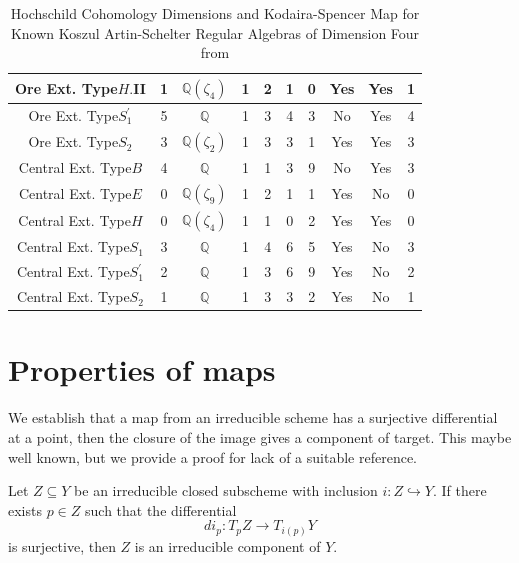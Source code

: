\documentclass{amsart}
\begin{document}
\begin{table}[H]
\begin{tabular}{|c|c|c|c|c|c|c|c|c|c|}
        Ore Ext. Type$H.$II  & 1 & $\mathbb{Q} (\zeta_4)$ & 1 & 2 & 1 & 0 & Yes & Yes & 1 \\ \hline
        Ore Ext. Type$S_1^{'}$  & 5 & $\mathbb{Q}$ & 1 & 3 & 4 & 3 & No & Yes & 4 \\ \hline
        Ore Ext. Type$S_2$& 3 & $\mathbb{Q} (\zeta_2)$ & 1 & 3 & 3 & 1 & Yes & Yes & 3\\ \hline
        Central Ext. Type$B$  & 4 & $\mathbb{Q}$ & 1 & 1 & 3 & 9 & No & Yes & 3\\ \hline
        Central Ext. Type$E$ & 0 & $\mathbb{Q}(\zeta_9)$ & 1 & 2 & 1 & 1 & Yes & No & 0\\ \hline
        Central Ext. Type$H$  &  0 & $\mathbb{Q}(\zeta_4)$  & 1 & 1 & 0 & 2 &Yes & Yes & 0 \\ \hline
        Central Ext. Type$S_1$  & 3 & $\mathbb{Q}$ & 1 & 4 & 6 & 5 & Yes & No & 3\\ \hline
        Central Ext. Type$S_1^{'}$  & 2 & $\mathbb{Q}$ & 1 & 3 & 6 & 9 & Yes & No & 2\\ \hline
        Central Ext. Type$S_2$  & 1 & $\mathbb{Q}$ & 1 & 3 & 3 & 2 & Yes & No & 1\\ \hline
        
      
    \end{tabular}
    \caption{Hochschild Cohomology Dimensions and Kodaira-Spencer Map for Known Koszul Artin-Schelter Regular Algebras of Dimension Four from \cite{Jacobson, MR1429334}}
    \label{tab:HH_dimensions_KS_map_new}
\end{table}

\section{Properties of maps}
We establish that a map from an irreducible scheme has a surjective differential at a point, then the closure of the image gives a component of target.  This maybe well known, but we provide a proof for lack of a suitable reference.

\begin{proposition}
Let \( Z \subseteq Y \) be an irreducible closed subscheme with inclusion \( i: Z \hookrightarrow Y \). If there exists \( p \in Z \) such that the differential 
\[
di_p : T_p Z \to T_{i(p)} Y
\]
is surjective, then \( Z \) is an irreducible component of \( Y \).
\label{prop:irreducible_component}
\end{proposition}
\end{document}
